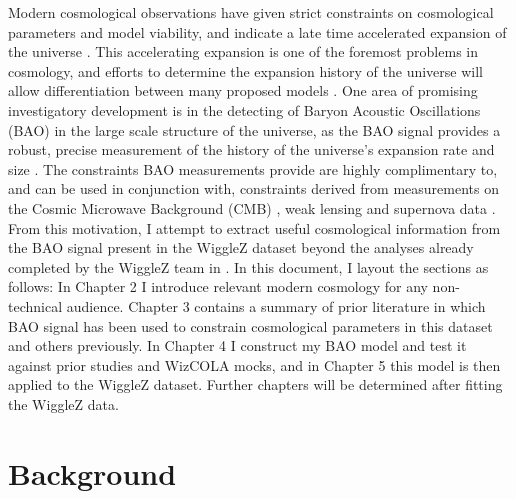 \documentclass[titlesmallcaps, examinerscopy, copyrightpage]{uqthesis}
\newcommand{\green}{\color{LimeGreen}}
\begin{document}
Modern cosmological observations have given strict constraints on cosmological parameters and model viability, and indicate a late time accelerated expansion of the universe \citep{RiessFilippenko1998, PerlmutterAldering1999, SpergelVerde2003, RiessStrolger2004, TegmarkBlanton2004, SanchezBaugh2006, SpergelBean2007, Komatsu2009, RiessMacri2009, PercivalReid2010, ReidPercival2010,BlakeKazin2011}. This accelerating expansion is one of the foremost problems in cosmology, and efforts to determine the expansion history of the universe will allow differentiation between many proposed models \citep{SanchezScoccola2012, AlbrechtBernstein2006}. One area of promising investigatory development is in the detecting of Baryon Acoustic Oscillations (BAO) in the large scale structure of the universe, as the BAO signal provides a robust, precise measurement of the history of the universe's expansion rate and size \citep{BlakeGlazebrook2003,HuHaiman2003,SeoEisenstein2003,Linder2003}. The constraints BAO measurements provide are highly complimentary to, and can be used in conjunction with, constraints derived from measurements on the Cosmic Microwave Background (CMB) \citep{BennettHalpern2003, Planck201416}, weak lensing \citep{VanWaerbeke2000,WittmanTyson2000,KaiserWilson2000} and supernova data \citep{KowalskiRubin2008, KesslerBeckerCinabro2009, BetouleKessler2014}.\\

From this motivation, I attempt to extract useful cosmological information from the BAO signal present in the WiggleZ dataset \citep[WiggleZ;][]{Drinkwater2010} beyond the analyses already completed by the WiggleZ team in \citet{BlakeDavis2011, BlakeKazin2011, BlakeBroughColless2011, BlakeGlazebrook2011, Parkinson2012}. In this document, I layout the sections as follows: In Chapter 2 I introduce relevant modern cosmology for any non-technical audience. Chapter 3 contains a summary of prior literature in which BAO signal has been used to constrain cosmological parameters in this dataset and others previously. In Chapter 4 I construct my BAO model and test it against prior studies and WizCOLA mocks, and in Chapter 5 this model is then applied to the WiggleZ dataset. {\green Further chapters will be determined after fitting the WiggleZ data.}







\chapter{Background}
\label{ch:back}
\end{document}
